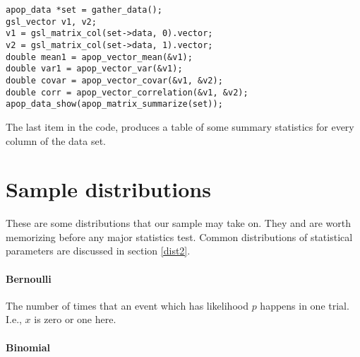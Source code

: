 \begin{lstlisting}
apop_data *set = gather_data();
gsl_vector v1, v2;
v1 = gsl_matrix_col(set->data, 0).vector;
v2 = gsl_matrix_col(set->data, 1).vector;
double mean1 = apop_vector_mean(&v1);
double var1 = apop_vector_var(&v1);
double covar = apop_vector_covar(&v1, &v2);
double corr = apop_vector_correlation(&v1, &v2);
apop_data_show(apop_matrix_summarize(set));
\end{lstlisting}
The last item in the code,  produces a table of
some summary statistics for every column of the data set.

\section{Sample distributions}
\label{distlist}

These are some distributions that our sample may take on. They
and are worth memorizing
before any major statistics test. Common distributions of statistical
parameters are discussed in section \ref{dist2}.

\paragraph{Bernoulli}

The number of times that an event which has likelihood $p$ happens in
one trial. I.e., $x$ is zero or one here.

\long{}

\long{}


\paragraph{Binomial}

